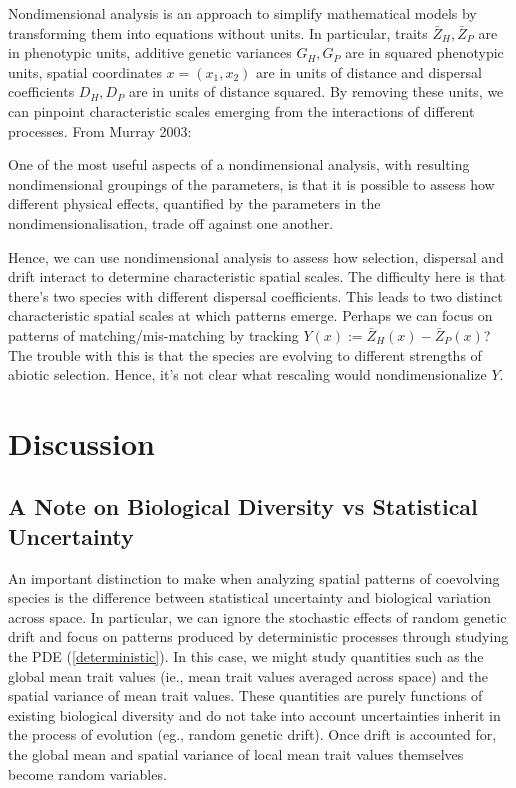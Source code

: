 \documentclass{article}
\begin{document}
Nondimensional analysis is an approach to simplify mathematical models
by transforming them into equations without units. In particular, traits
\(\bar Z_H,\bar Z_P\) are in phenotypic units, additive genetic
variances \(G_H,G_P\) are in squared phenotypic units, spatial
coordinates \(x=(x_1,x_2)\) are in units of distance and dispersal
coefficients \(D_H,D_P\) are in units of distance squared. By removing
these units, we can pinpoint characteristic scales emerging from the
interactions of different processes. From Murray 2003:

\begin{displayquote}
  One of the most useful aspects of a nondimensional analysis, with resulting nondimensional groupings of the parameters, is that it is possible to assess how different physical effects, quantified by the parameters in the nondimensionalisation, trade off against one another.
\end{displayquote}

Hence, we can use nondimensional analysis to assess how selection,
dispersal and drift interact to determine characteristic spatial scales.
The difficulty here is that there's two species with different dispersal
coefficients. This leads to two distinct characteristic spatial scales
at which patterns emerge. Perhaps we can focus on patterns of
matching/mis-matching by tracking \(Y(x):=\bar Z_H(x)-\bar Z_P(x)\)? The
trouble with this is that the species are evolving to different
strengths of abiotic selection. Hence, it's not clear what rescaling
would nondimensionalize \(Y\).

\hypertarget{discussion}{%
\section{Discussion}\label{discussion}}

\hypertarget{a-note-on-biological-diversity-vs-statistical-uncertainty}{%
\subsection{A Note on Biological Diversity vs Statistical
Uncertainty}\label{a-note-on-biological-diversity-vs-statistical-uncertainty}}

An important distinction to make when analyzing spatial patterns of
coevolving species is the difference between statistical uncertainty and
biological variation across space. In particular, we can ignore the
stochastic effects of random genetic drift and focus on patterns
produced by deterministic processes through studying the PDE
(\ref{deterministic}). In this case, we might study quantities such as
the global mean trait values (ie., mean trait values averaged across
space) and the spatial variance of mean trait values. These quantities
are purely functions of existing biological diversity and do not take
into account uncertainties inherit in the process of evolution (eg.,
random genetic drift). Once drift is accounted for, the global mean and
spatial variance of local mean trait values themselves become random
variables.
\end{document}
